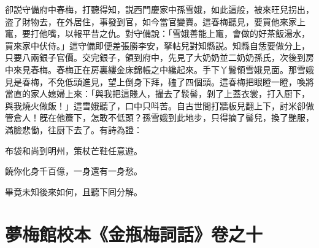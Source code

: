 卻説守備府中春梅，打聽得知，説西門慶家中孫雪娥，如此這般，被來旺兒拐出，盗了財物去，在外居住，事發到官，如今當官變賣。這春梅聽見，要買他來家上竃，要打他嘴，以報平昔之仇。對守備說：「雪娥善能上竃，會做的好茶飯湯水，買來家中伏侍。」這守備即便差張勝李安，拏帖兒對知縣説。知縣自恁要做分上，只要八兩銀子官價。交完銀子，領到府中，先見了大奶奶並二奶奶孫氏，次後到房中來見春梅。春梅正在房裏縷金床錦帳之中纔起來。手下丫鬟領雪娥見面。那雪娥見是春梅，不免低頭進見，望上倒身下拜，磕了四個頭。這春梅把眼瞪一瞪，喚將當直的家人媳婦上來：「與我把這賤人，撮去了䯼髻，剝了上蓋衣裳，打入厨下，與我燒火做飯！」這雪娥聽了，口中只呌苦。自古世間打牆板兒翻上下，討米卻做管倉人！旣在他簷下，怎敢不低頭？孫雪娥到此地步，只得摘了髻兒，換了艷服，滿臉悲慟，往厨下去了。有詩為證：

\begin{myquote}
布袋和尚到明州，策杖芒鞋任意遊。

饒你化身千百億，一身還有一身愁。
\end{myquote}

畢竟未知後來如何，且聽下囘分解。

\part*{夢梅館校本《金瓶梅詞話》卷之十}

